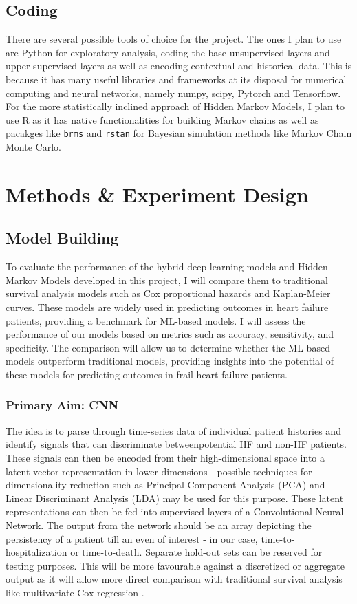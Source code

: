 \documentclass[%
 reprint,
 amsmath,amssymb,
 aps,
 nofootinbib,
]{revtex4-2}
\theoremstyle{definition}
\begin{document}
\subsection{\label{coding}Coding}

There are several possible tools of choice for the project. The ones I plan to use are Python for exploratory analysis, coding the base unsupervised layers and upper supervised layers as well as encoding contextual and historical data. This is because it has many useful libraries and frameworks at its disposal for numerical computing and neural networks, namely numpy, scipy, Pytorch and Tensorflow. For the more statistically inclined approach of Hidden Markov Models, I plan to use R as it has native functionalities for building Markov chains as well as pacakges like \texttt{brms} and \texttt{rstan} for Bayesian simulation methods like Markov Chain Monte Carlo.

\section{\label{methods}Methods \& Experiment Design}

\subsection{\label{build}Model Building}
To evaluate the performance of the hybrid deep learning models and Hidden Markov Models developed in this project, I will compare them to traditional survival analysis models such as Cox proportional hazards and Kaplan-Meier curves. These models are widely used in predicting outcomes in heart failure patients, providing a benchmark for ML-based models. I will assess the performance of our models based on metrics such as accuracy, sensitivity, and specificity. The comparison will allow us to determine whether the ML-based models outperform traditional models, providing insights into the potential of these models for predicting outcomes in frail heart failure patients.
\subsubsection{\label{prim}Primary Aim: CNN}
The idea is to parse through time-series data of individual patient histories and identify signals that can discriminate betweenpotential  HF and non-HF patients. These signals can then be encoded from their high-dimensional space into a latent vector representation in lower dimensions - possible techniques for dimensionality reduction such as Principal Component Analysis (PCA) and Linear Discriminant Analysis (LDA) may be used for this purpose. These latent representations can then be fed into supervised layers of a Convolutional Neural Network. The output from the network should be an array depicting the persistency of a patient till an even of interest - in our case, time-to-hospitalization or time-to-death. Separate hold-out sets can be reserved for testing purposes. This will be more favourable against a discretized or aggregate output as it will allow more direct comparison with traditional survival analysis like multivariate Cox regression \citep{lin1994cox}.
\end{document}
